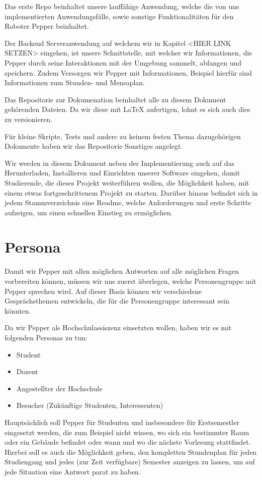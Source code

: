 Das erste Repo beinhaltet unsere lauffähige Anwendung, welche die von uns
implementierten Anwendungsfälle, sowie sonstige Funktionalitäten für den Roboter Pepper beinhaltet.

Der Backend Serveranwendung auf welchem wir in Kapitel <HIER LINK SETZEN> eingehen, ist unsere Schnittstelle, mit welcher wir
Informationen, die Pepper durch seine Interaktionen mit der Umgebung sammelt, abfangen und speichern. Zudem Versorgen wir
Pepper mit Informationen, Beispiel hierfür sind Informationen zum Stunden- und Mensaplan.

Das Repositorie zur Dokumenation beinhaltet alle zu diesem Dokument gehörenden Dateien. Da wir diese mit LaTeX anfertigen,
lohnt es sich auch dies zu versionieren.

Für kleine Skripte, Tests und andere zu keinem festen Thema dazugehörigen Dokumente haben wir das Repositorie
\grqq{}Sonstiges\grqq{} angelegt.

Wir werden in diesem Dokument neben der Implementierung auch auf das Herunterladen, Installieren und Einrichten
unserer Software eingehen, damit Studierende, die dieses Projekt weiterführen wollen, die Möglichkeit
haben, mit einem etwas fortgeschrittenem Projekt zu starten. Darüber hinaus befindet sich in jedem Stammverzeichnis
eine Readme, welche Anforderungen und erste Schritte aufzeigen, um einen schnellen Einstieg zu ermöglichen.\\

\section{Persona}
Damit wir Pepper mit allen möglichen Antworten auf alle möglichen Fragen vorbereiten können, müssen wir uns zuerst überlegen, welche Personengruppe mit Pepper sprechen wird. Auf dieser Basis können wir verschiedene Gesprächsthemen entwickeln, die für die Personengruppe interessant sein könnten.

Da wir Pepper als Hochschulassiszenz einsetzten wollen, haben wir es mit folgenden Personas zu tun:
\begin{itemize}
    \item Student
    \item Dozent
    \item Angestellter der Hochschule
    \item Besucher (Zukünftige Studenten, Interessenten)
\end{itemize}

Hauptsächlich soll Pepper für Studenten und insbesondere für Erstsemestler eingesetzt werden, die zum Beispiel nicht wissen, wo sich ein bestimmter Raum oder ein Gebäude befindet oder wann und wo die nächste Vorlesung stattfindet. Hierbei soll es auch die Möglichkeit geben, den kompletten Stundenplan für jeden Studiengang und jedes (zur Zeit verfügbare) Semester anzeigen zu lassen, um auf jede Situation eine Antwort parat zu haben.

